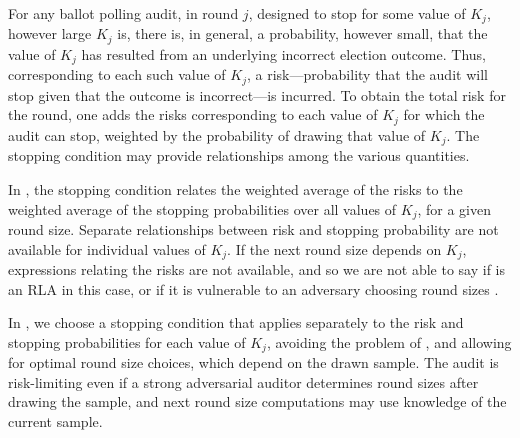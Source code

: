 For any ballot polling audit, in round $j$, designed to stop for some value of $K_j$, however large $K_j$ is, there is, in general, a probability, however small, that the value of $K_j$ has resulted from an underlying incorrect election outcome. Thus, corresponding to each such value of $K_j$, a risk---probability that the audit will stop given that the outcome is incorrect---is incurred. To obtain the total risk for the round, one adds the risks corresponding to each value of $K_j$ for which the audit can stop, weighted by the probability of drawing that value of $K_j$. The stopping condition may provide relationships among the various quantities.

In \Minerva, the stopping condition relates the weighted average of the risks to the weighted average of the stopping probabilities over all values of $K_j$, for a given round size. Separate relationships between risk and stopping probability are not available for individual values of $K_j$. If the next round size depends on $K_j$, expressions relating the risks are not available, and so we are not able to say if \Minerva is an RLA in this case, or if it is vulnerable to an adversary choosing round sizes \cite{usenix_minerva, arxiv_athena}. 

In \Providence, we choose a stopping condition that applies separately to the risk and stopping probabilities for each value of $K_j$, avoiding the problem of \Minerva, and allowing for optimal round size choices, which depend on the drawn sample. 
The \Providence audit is risk-limiting even if a strong adversarial auditor determines round sizes after drawing the sample, and next round size computations may use knowledge of the current sample. 

